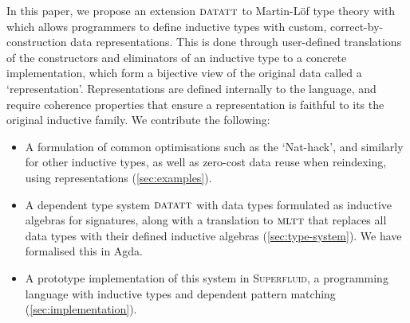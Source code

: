 In this paper, we propose an extension ${\textsc{datatt}}$ to Martin-L\"of type theory with
which allows programmers to define inductive types with custom,
correct-by-construction data representations. This is done through user-defined
translations of the constructors and eliminators of an inductive type to a
concrete implementation, which form a bijective view of the original data called
a `representation'. Representations are defined internally to the language, and
require coherence properties that ensure a representation is faithful to its the
original inductive family. We contribute the following:
\begin{itemize}
    \item A formulation of common optimisations such as the `Nat-hack', and
        similarly for other inductive types, as well as zero-cost data reuse when
        reindexing, using representations (\cref{sec:examples}).
        \item A dependent type system ${\textsc{datatt}}$ with data types formulated
        as inductive algebras for signatures, along with a translation to
        ${\textsc{mltt}}$ that replaces all data types with their defined inductive
        algebras (\cref{sec:type-system}). We have formalised this in Agda.
        \item A prototype implementation of this system in \textsc{Superfluid},
        a programming language with inductive types and dependent pattern
        matching (\cref{sec:implementation}).
\end{itemize}
